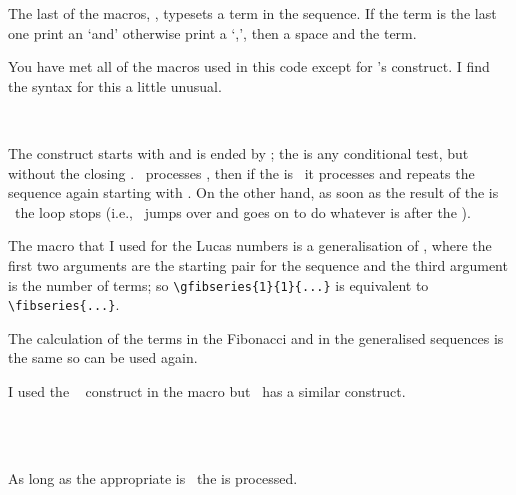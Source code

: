 The last of the macros, \cmd{\printfibterm}, typesets a term in the sequence. 
If the term is the last one print an `and' otherwise print a `,', 
then a space and the term.
\begin{lcode}
\newcommand*{\printfibterm}{%
  \ifnum \fibtogo=\@ne \space and \else , \fi 
  \the\fib}
\end{lcode}

    You have met all of the macros used in this code except for \tx's
 construct. I find the syntax for this a little unusual.
\begin{syntax}
     \\
\end{syntax} 
The construct starts with  and is ended by ;
the  is any conditional test, but without the closing .
\tx\ processes , then if the  is \ptrue\
it processes  and repeats the sequence again starting
with \meta{text1}. On the other hand, as soon as the result of the
\cs{if...} is 
\pfalse\ the loop stops (i.e., \tx\ jumps over 
and goes on to do whatever is after the ).

    The \cmd{\gfibseries} macro that I used for the Lucas numbers is a
generalisation of \cmd{\fibseries}, where the first two arguments are the
starting pair for the sequence and the third argument is the number
of terms; so \verb?\gfibseries{1}{1}{...}? is equivalent to
\verb?\fibseries{...}?.
\begin{lcode}
\newcommand*{\gfibseries}[3]{%
  \fibprevprev=#1\relax
  \fibprev=#2\relax
  \ifnum #3>0\relax
    \@fibseries{#3}%
  \fi}
\end{lcode}
    The calculation of the terms in the Fibonacci and in the generalised 
sequences is the same so \cmd{\@fibseries} can be used again.

    I used the \tx\  construct in the \cmd{\@fibseries} macro
but \ltx\ has a similar construct.
\begin{syntax}
\cmd{\@whilenum}  \cmd{\do}  \\
\cmd{\@whiledim}  \cmd{\do} \marg{body} \\
\end{syntax}
As long as the appropriate  is \ptrue\ the  is processed.

